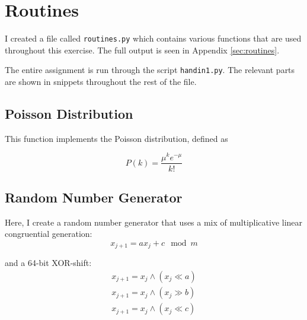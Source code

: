 \newpage
\section{Routines}

I created a file called \texttt{routines.py} which contains various functions that are used throughout this exercise. The full output is seen in Appendix \ref{sec:routines}.

The entire assignment is run through the script \texttt{handin1.py}. The relevant parts are shown in snippets throughout the rest of the file.


 \label{list:header}

    \newpage
    \subsection{Poisson Distribution}

    This function implements the Poisson distribution, defined as

    \begin{equation}
        P(k) = \frac{\mu^k e^{-\mu}}{k!}
        \label{eq:poisson}
    \end{equation}

    
    
    



    \newpage
    \subsection{Random Number Generator}

    Here, I create a random number generator that uses a mix of multiplicative linear congruential generation:
    \begin{equation}
        x_{j+1} = a x_{j} + c \mod m
        \label{eq:mlcg}
    \end{equation}

    and a 64-bit XOR-shift:
    \begin{equation}
        \begin{array}{l}
        x_{j+1} = x_{j} \land (x_{j} \ll a) \\
        x_{j+1} = x_{j} \land (x_{j} \gg b) \\
        x_{j+1} = x_{j} \land (x_{j} \ll c)
        \end{array}
        \label{eq:xor_shift}
    \end{equation}

